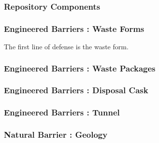 

\begin{frame}[ctb!]
  \frametitle{Repository Components}
\footnotesize{
  
}
\end{frame}

\begin{frame}[ctb!]
  \frametitle{Engineered Barriers : Waste Forms}
\footnotesize{
  The first line of defense is the waste form.
  
}
\end{frame}

\begin{frame}[ctb!]
  \frametitle{Engineered Barriers : Waste Packages}
\footnotesize{
  
}
\end{frame}

\begin{frame}[ctb!]
  \frametitle{Engineered Barriers : Disposal Cask}
\footnotesize{
  
}
\end{frame}

\begin{frame}[ctb!]
  \frametitle{Engineered Barriers : Tunnel}
\footnotesize{
  
}
\end{frame}

\begin{frame}[ctb!]
  \frametitle{Natural Barrier : Geology}
\footnotesize{
  
}
\end{frame}
